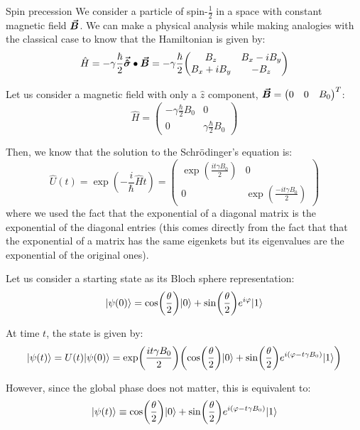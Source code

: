 \documentclass[a4paper]{article}
\begin{document}
\begin{parag}{Spin precession}
    We consider a particle of spin-$\frac{1}{2}$ in a space with constant magnetic field $\bm{\protect\vec{B}}$. We can make a physical analysis while making analogies with the classical case to know that the Hamiltonian is given by: 
    \[\hat{H} = -\gamma \frac{\hbar}{2} \bvec{\hat{\sigma}} \dotprod \bvec{B} = -\gamma \frac{\hbar}{2} \begin{pmatrix} B_z & B_x - i B_y \\ B_x + i B_y & -B_z \end{pmatrix} \]
    
    Let us consider a magnetic field with only a $\hat{z}$ component, $\bm{\protect\vec{B}} = \begin{pmatrix} 0 & 0 & B_0 \end{pmatrix} ^T$: 
    \[\hat{H} = \begin{pmatrix} -\gamma \frac{\hbar}{2} B_0 & 0 \\ 0 & \gamma \frac{\hbar}{2} B_0 \end{pmatrix} \]
    

    Then, we know that the solution to the Schrödinger's equation is: 
    \[\hat{U}\left(t\right) = \exp\left(-\frac{i}{\hbar}\hat{H}t\right) = \begin{pmatrix} \exp\left(\frac{i t \gamma B_0}{2}\right) & 0 \\ 0 & \exp\left(\frac{-i t \gamma B_0}{2}\right) \end{pmatrix} \]
    where we used the fact that the exponential of a diagonal matrix is the exponential of the diagonal entries (this comes directly from the fact that that the exponential of a matrix has the same eigenkets but its eigenvalues are the exponential of the original ones).
    
    Let us consider a starting state as its Bloch sphere representation: 
    \[\ket{\psi\left(0\right)} = \cos\left(\frac{\theta}{2}\right)\ket{0} + \sin\left(\frac{\theta}{2}\right) e^{i \phi} \ket{1}\]
    
    At time $t$, the state is given by: 
    \[\ket{\psi\left(t\right)} = U\left(t\right) \ket{\psi\left(0\right)} = \exp\left(\frac{i t \gamma B_0}{2}\right) \left(\cos\left(\frac{\theta}{2}\right)\ket{0} + \sin\left(\frac{\theta}{2}\right) e^{i\left(\phi - t \gamma B_0\right)} \ket{1}\right)\]
    
    However, since the global phase does not matter, this is equivalent to: 
    \[\ket{\psi\left(t\right)} \equiv \cos\left(\frac{\theta}{2}\right) \ket{0} + \sin\left(\frac{\theta}{2}\right) e^{i\left(\phi - t \gamma B_0\right)}\ket{1}\]
    

\end{parag}
\end{document}
